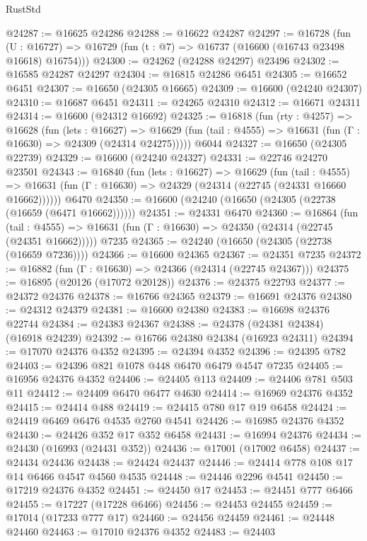 \begin{lexlean}{RustStd}
\begin{coremodule}
@24287 := @16625 @24286
@24288 := @16622 @24287
@24297 := @16728
    (fun (U : @16727) => @16729 (fun (t : @7) => @16737 (@16600 (@16743 @23498 @16618) @16754)))
@24300 := @24262 (@24288 @24297) @23496
@24302 := @16585 @24287 @24297
@24304 := @16815 @24286 @6451
@24305 := @16652 @6451
@24307 := @16650 (@24305 @16665)
@24309 := @16600 (@24240 @24307)
@24310 := @16687 @6451
@24311 := @24265 @24310
@24312 := @16671 @24311
@24314 := @16600 (@24312 @16692)
@24325 := @16818
    (fun (rty : @4257) =>
    @16628
      (fun (lets : @16627) =>
      @16629 (fun (tail : @4555) => @16631 (fun (Γ : @16630) => @24309 (@24314 @24275)))))
    @6044
@24327 := @16650 (@24305 @22739)
@24329 := @16600 (@24240 @24327)
@24331 := @22746 @24270 @23501
@24343 := @16840
    (fun (lets : @16627) =>
    @16629
      (fun (tail : @4555) =>
      @16631 (fun (Γ : @16630) => @24329 (@24314 (@22745 (@24331 @16660 @16662))))))
    @6470
@24350 := @16600 (@24240 (@16650 (@24305 (@22738 (@16659 (@6471 @16662))))))
@24351 := @24331 @6470
@24360 := @16864
    (fun (tail : @4555) => @16631 (fun (Γ : @16630) => @24350 (@24314 (@22745 (@24351 @16662)))))
    @7235
@24365 := @24240 (@16650 (@24305 (@22738 (@16659 @7236))))
@24366 := @16600 @24365
@24367 := @24351 @7235
@24372 := @16882 (fun (Γ : @16630) => @24366 (@24314 (@22745 @24367)))
@24375 := @16895 (@20126 (@17072 @20128))
@24376 := @24375 @22793
@24377 := @24372 @24376
@24378 := @16766 @24365
@24379 := @16691 @24376
@24380 := @24312 @24379
@24381 := @16600 @24380
@24383 := @16698 @24376 @22744
@24384 := @24383 @24367
@24388 := @24378 (@24381 @24384) (@16918 @24239)
@24392 := @16766 @24380 @24384 (@16923 @24311)
@24394 := @17070 @24376 @4352
@24395 := @24394 @4352
@24396 := @24395 @782
@24403 := @24396 @821 @1078 @448 @6470 @6479 @4547 @7235
@24405 := @16956 @24376 @4352
@24406 := @24405 @113
@24409 := @24406 @781 @503 @11
@24412 := @24409 @6470 @6477 @4630
@24414 := @16969 @24376 @4352
@24415 := @24414 @488
@24419 := @24415 @780 @17 @19 @6458
@24424 := @24419 @6469 @6476 @4535 @2760 @4541
@24426 := @16985 @24376 @4352
@24430 := @24426 @352 @17 @352 @6458
@24431 := @16994 @24376
@24434 := @24430 (@16993 (@24431 @352))
@24436 := @17001 (@17002 @6458)
@24437 := @24434 @24436
@24438 := @24424 @24437
@24446 := @24414 @778 @108 @17 @14 @6466 @4547 @4560 @4535
@24448 := @24446 @2296 @4541
@24450 := @17219 @24376 @4352
@24451 := @24450 @17
@24453 := @24451 @777 @6466
@24455 := @17227 (@17228 @6466)
@24456 := @24453 @24455
@24459 := @17014 (@17233 @777 @17)
@24460 := @24456 @24459
@24461 := @24448 @24460
@24463 := @17010 @24376 @4352
@24483 := @24403

\end{coremodule}
\end{lexlean}
